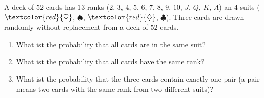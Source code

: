 
\begin{exercise}

A deck of $52$ cards has $13$ ranks ($2$, $3$, $4$, $5$, $6$, $7$, $8$, $9$, $10$, $J$, $Q$, $K$, $A$) an $4$ suits ($\textcolor{red}{\heartsuit}$, $\spadesuit$, $\textcolor{red}{\diamondsuit}$, $\clubsuit$).
Three cards are drawn randomly without replacement from a deck of $52$ cards.

\begin{enumerate}[label = (\alph*)]
    \item What ist the probability that all cards are in the same suit?
    \item What ist the probability that all cards have the same rank?
    \item What ist the probability that the three cards contain exactly one pair (a pair means two cards with the same rank from two different suits)?
\end{enumerate}

\end{exercise}


